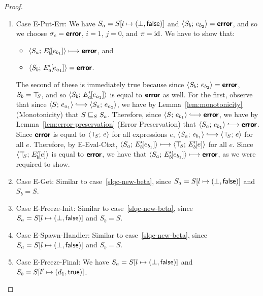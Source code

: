 \begin{proof}
\begin{enumerate}
\begin{enumerate}
    \item \label{slqc-new-put-err}Case {\sc E-Put-Err}: We have $S_a =
      S[l \mapsto (\bot, \textsf{false})]$ and $\langle S_b;\, e_{b_2} \rangle =
      \textbf{\textsf{error}}$, and so we choose $\sigma_c = \textbf{\textsf{error}}$, $i = 1$, $j = 0$,
      and $\pi = \mathrm{id}$.  We have to show that:
      \begin{itemize}
      \item $\langle S_a;\, E'_b\hspace{-1mm}\left[e_{b_1}\right] \rangle \longmapsto
        \textbf{\textsf{error}}$, and
      \item
        $\langle S_b;\, E'_a\hspace{-1mm}\left[e_{a_1}\right] \rangle = \textbf{\textsf{error}}$.
      \end{itemize}

      The second of these is immediately true because since
      $\langle S_b;\, e_{b_2} \rangle = \textbf{\textsf{error}}$, $S_b = \top\hspace{-0.85mm}_{S}$, and so
      $\langle S_b;\, E'_a\hspace{-1mm}\left[e_{a_1}\right] \rangle$ is equal to $\textbf{\textsf{error}}$ as
      well.  For the first, observe that since $\config{S}{e_{a_1}}
      \parstepsto \config{S_a}{e_{a_2}}$, we have by
      Lemma~\ref{lem:monotonicity} (Monotonicity) that
      $S \sqsubseteq_S S_a$.  Therefore, since $\config{S}{e_{b_1}}
      \parstepsto \error$, we have by
      Lemma~\ref{lem:error-preservation} (Error Preservation) that
      $\config{S_a}{e_{b_1}} \parstepsto \error$.  Since $\textbf{\textsf{error}}$ is
      equal to $\langle \top\hspace{-0.85mm}_{S};\, e \rangle$ for all expressions $e$,
      $\config{S_a}{e_{b_1}} \parstepsto \config{\topS}{e}$ for all
      $e$.  Therefore, by {\sc E-Eval-Ctxt},
      $\langle S_a;\, E'_b\hspace{-1mm}\left[e_{b_1}\right] \rangle \longmapsto
      \langle \top\hspace{-0.85mm}_{S};\, E'_b\hspace{-1mm}\left[e\right] \rangle$ for all $e$.  Since
      $\langle \top\hspace{-0.85mm}_{S};\, E'_b\hspace{-1mm}\left[e\right] \rangle$ is equal to $\textbf{\textsf{error}}$, we
      have that $\langle S_a;\, E'_b\hspace{-1mm}\left[e_{b_1}\right] \rangle \longmapsto
      \textbf{\textsf{error}}$, as we were required to show.

    \item \label{slqc-new-get}Case {\sc E-Get}: Similar to
      case~\ref{slqc-new-beta}, since $S_a =
      S[l \mapsto (\bot, \textsf{false})]$ and $S_b = S$.
    \item \label{slqc-new-freeze-init}Case {\sc E-Freeze-Init}:
      Similar to case~\ref{slqc-new-beta}, since $S_a =
      S[l \mapsto (\bot, \textsf{false})]$ and $S_b = S$.
    \item \label{slqc-new-spawn-handler}Case {\sc E-Spawn-Handler}:
      Similar to case~\ref{slqc-new-beta}, since $S_a =
      S[l \mapsto (\bot, \textsf{false})]$ and $S_b = S$.
    \item \label{slqc-new-freeze-final}Case {\sc E-Freeze-Final}: We
      have $S_a = S[l \mapsto (\bot, \textsf{false})]$ and $S_b =
      S[l' \mapsto (d_1, \textsf{true})]$.


\end{enumerate}
\end{enumerate}
\end{proof}

